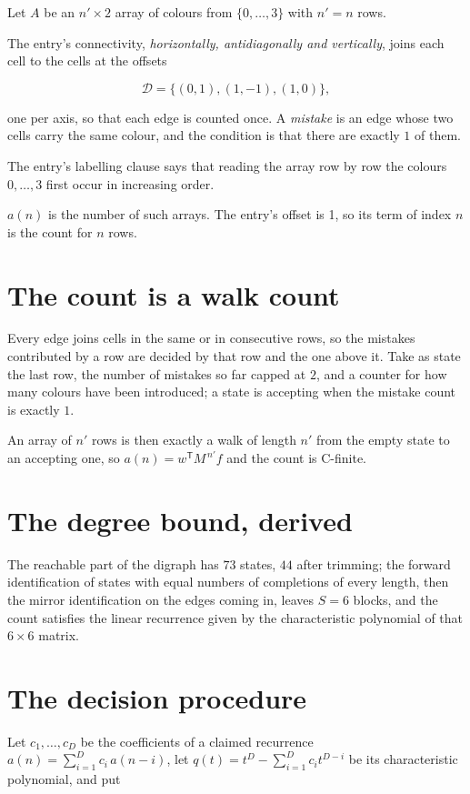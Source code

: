 \documentclass[11pt]{article}
\theoremstyle{definition}
\begin{document}
Let $A$ be an $n' \times 2$ array of colours from $\{0,\dots,3\}$ with $n' = n$ rows.

The entry's connectivity, {\itshape horizontally, antidiagonally and vertically}, joins each cell to the cells at the offsets

\[\mathcal{D} = \{(0,1), (1,-1), (1,0)\},\]

one per axis, so that each edge is counted once. A {\itshape mistake} is an edge whose two cells carry the same colour, and the condition is that there are exactly $1$ of them.

The entry's labelling clause says that reading the array row by row the colours $0,\dots,3$ first occur in increasing order.

$a(n)$ is the number of such arrays. The entry's offset is 1, so its term of index $n$ is the count for $n$ rows.

\section{The count is a walk count}

Every edge joins cells in the same or in consecutive rows, so the mistakes contributed by a row are decided by that row and the one above it. Take as state the last row, the number of mistakes so far capped at $2$, and a counter for how many colours have been introduced; a state is accepting when the mistake count is exactly $1$.

An array of $n'$ rows is then exactly a walk of length $n'$ from the empty state to an accepting one, so $a(n) = w^{\mathsf T}M^{\,n'}f$ and the count is C-finite.

\section{The degree bound, derived}

The reachable part of the digraph has $73$ states, $44$ after trimming; the forward identification of states with equal numbers of completions of every length, then the mirror identification on the edges coming in, leaves $S = 6$ blocks, and the count satisfies the linear recurrence given by the characteristic polynomial of that $6\times6$ matrix.

\section{The decision procedure}

Let $c_1,\dots,c_D$ be the coefficients of a claimed recurrence $a(n) = \sum_{i=1}^{D} c_i\,a(n-i)$, let $q(t) = t^{D} - \sum_{i=1}^{D} c_i t^{D-i}$ be its characteristic polynomial, and put
\end{document}
